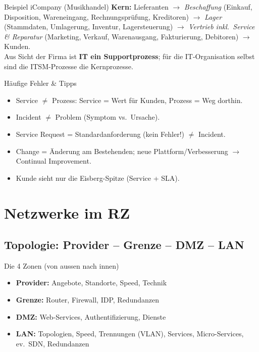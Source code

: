 \documentclass[a4paper, fontsize=7pt]{scrartcl}
\begin{document}
\begin{subbox}{Beispiel iCompany (Musikhandel)}
\textbf{Kern:} Lieferanten $\to$ \emph{Beschaffung} (Einkauf, Disposition,
Wareneingang, Rechnungsprüfung, Kreditoren) $\to$ \emph{Lager}
(Stammdaten, Umlagerung, Inventur, Lagersteuerung) $\to$ \emph{Vertrieb
inkl.\ Service \& Reparatur} (Marketing, Verkauf, Warenausgang,
Fakturierung, Debitoren) $\to$ Kunden.\\
Aus Sicht der Firma ist \textbf{IT ein Supportprozess}; für die
IT-Organisation selbst sind die ITSM-Prozesse die Kernprozesse.
\end{subbox}

\begin{subbox}{Häufige Fehler \& Tipps}
\begin{itemize}
    \item Service $\neq$ Prozess: Service = Wert für Kunden, Prozess = Weg
          dorthin.
    \item Incident $\neq$ Problem (Symptom vs.\ Ursache).
    \item Service Request = Standardanforderung (kein Fehler!) $\neq$
          Incident.
    \item Change = Änderung am Bestehenden; neue Plattform/Verbesserung
          $\to$ Continual Improvement.
    \item Kunde sieht nur die Eisberg-Spitze (Service + SLA).
\end{itemize}
\end{subbox}

\section{Netzwerke im RZ}

\subsection{Topologie: Provider -- Grenze -- DMZ -- LAN}

\begin{mainbox}{Die 4 Zonen (von aussen nach innen)}
\begin{itemize}
    \item \textbf{Provider:} Angebote, Standorte, Speed, Technik
    \item \textbf{Grenze:} Router, Firewall, IDP, Redundanzen
    \item \textbf{DMZ:} Web-Services, Authentifizierung, Dienste
    \item \textbf{LAN:} Topologien, Speed, Trennungen (VLAN), Services,
          Micro-Services, ev.\ SDN, Redundanzen
\end{itemize}
\end{mainbox}
\end{document}
